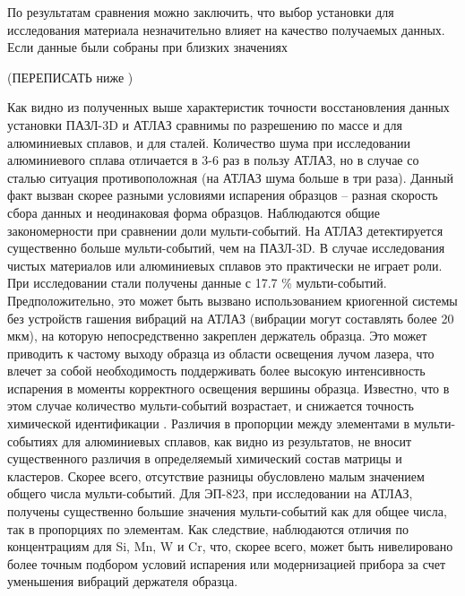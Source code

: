 По результатам сравнения можно заключить, что выбор установки для исследования материала незначительно влияет на качество получаемых данных. Если данные были собраны при близких значениях 

(ПЕРЕПИСАТЬ ниже )















Как видно из полученных выше характеристик точности восстановления данных установки ПАЗЛ-3D и АТЛАЗ сравнимы по разрешению по массе и для алюминиевых сплавов, и для сталей. Количество шума при исследовании алюминиевого сплава отличается в 3-6 раз в пользу АТЛАЗ, но в случае со сталью ситуация противоположная (на АТЛАЗ шума больше в три раза). Данный факт вызван скорее разными условиями испарения образцов – разная скорость сбора данных и неодинаковая форма образцов. Наблюдаются общие закономерности при сравнении доли мульти-событий. На АТЛАЗ детектируется существенно больше мульти-событий, чем на ПАЗЛ-3D. В случае исследования чистых материалов или алюминиевых сплавов это практически не играет роли. При исследовании стали получены данные с 17.7 \% мульти-событий. Предположительно, это может быть вызвано использованием криогенной системы без устройств гашения вибраций на АТЛАЗ (вибрации могут составлять более 20 мкм), на которую непосредственно закреплен держатель образца. Это может приводить к частому выходу образца из области освещения лучом лазера, что влечет за собой необходимость поддерживать более высокую интенсивность испарения в моменты корректного освещения вершины образца. Известно, что в этом случае количество мульти-событий возрастает, и снижается точность химической идентификации \cite{scbibOptParamsYAFI}. Различия в пропорции между элементами в мульти-событиях для алюминиевых сплавов, как видно из результатов, не вносит существенного различия в определяемый химический состав матрицы и кластеров. Скорее всего, отсутствие разницы обусловлено малым значением общего числа мульти-событий. Для ЭП-823, при исследовании на АТЛАЗ, получены существенно большие значения мульти-событий как для общее числа, так в пропорциях по элементам. Как следствие, наблюдаются отличия по концентрациям для Si, Mn, W и Cr, что, скорее всего, может быть нивелировано более точным подбором условий испарения или модернизацией прибора за счет уменьшения вибраций держателя образца.


